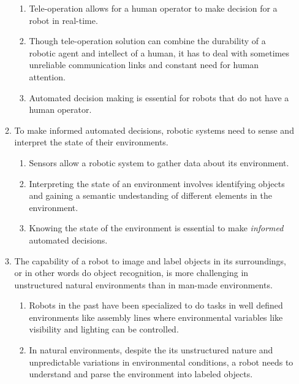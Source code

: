 \documentclass {udthesis}
\begin{document}
\begin{enumerate}[label=Chapter \arabic*:]
\begin{enumerate}[label=Section \arabic*:, start=0]
\begin{enumerate}[label=Para \arabic*:, start=1]
      \item Tele-operation allows for a human operator to make decision for a robot in real-time.
      
      \item Though tele-operation solution can combine the durability of a robotic agent and intellect of a human, it has to deal with sometimes unreliable communication links and constant need for human attention.

      \item Automated decision making is essential for robots that do not have a human operator.
	\end{enumerate}
	    
  \item To make informed automated decisions, robotic systems need to sense and interpret the state of their environments.

    \begin{enumerate}[label=Para \arabic*:, start=1]

      \item Sensors allow a robotic system to gather data about its environment.
      
      \item Interpreting the state of an environment involves identifying objects and gaining a semantic undestanding of different elements in the environment.
            
      \item Knowing the state of the environment is essential to make \emph{informed} automated decisions.
      
    \end{enumerate}
                    
  \item The capability of a robot to image and label objects in its surroundings, or in other words do object recognition, is more challenging in unstructured natural environments than in man-made environments.
  
    \begin{enumerate}[label=Para \arabic*:, start=1]
      \item Robots in the past have been specialized to do tasks in well defined environments like assembly lines  where environmental variables like visibility and lighting can be controlled.      
      
      \item In natural environments, despite the its unstructured nature and unpredictable variations in environmental conditions, a robot needs to understand and parse the environment into labeled objects.
      

\end{enumerate}
\end{enumerate}
\end{enumerate}
\end{document}

